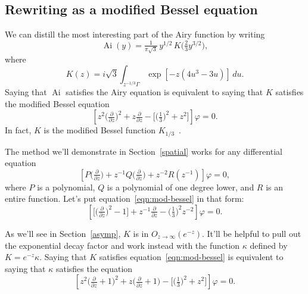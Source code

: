 \documentclass{article}
\theoremstyle{plain}
\DeclareMathOperator{\Ai}{Ai}
\begin{document}
\subsection{Rewriting as a modified Bessel equation}
We can distill the most interesting part of the Airy function by writing
\[ \Ai(y) = \tfrac{1}{\pi\sqrt{3}}\,y^{1/2}\,K\big(\tfrac{2}{3} y^{3/2}\big), \]
where
\begin{equation}\label{integral:mod-bessel}
K(z) = i\sqrt{3} \int_{z^{-1/3}\Gamma} \exp\left[-z \left(4u^3 - 3u\right)\right]\,du.
\end{equation}
Saying that $\Ai$ satisfies the Airy equation is equivalent to saying that $K$ satisfies the modified Bessel equation
\begin{equation}\label{eqn:mod-bessel}
\left[z^2 \big(\tfrac{\partial}{\partial z}\big)^2 + z \tfrac{\partial}{\partial z} - \big[\big(\tfrac{1}{3}\big)^2 + z^2\big]\right] \varphi = 0.
\end{equation}
In fact, $K$ is the modified Bessel function $K_{1/3}$~\cite[equation~9.6.1]{dlmf}.

The method we'll demonstrate in Section~\ref{spatial} works for any differential equation
\[ \left[ P\big(\tfrac{\partial}{\partial z}\big) + z^{-1} Q\big(\tfrac{\partial}{\partial z}\big) + z^{-2} R(z^{-1}) \right] \varphi = 0, \]
where $P$ is a polynomial, $Q$ is a polynomial of one degree lower, and $R$ is an entire function. Let's put equation~\ref{eqn:mod-bessel} in that form:
\begin{equation}\label{eqn:reg-mod-bessel}
\left[ \big[ \big(\tfrac{\partial}{\partial z}\big)^2 - 1 \big] + z^{-1} \tfrac{\partial}{\partial z} - \big(\tfrac{1}{3}\big)^2 z^{-2} \right] \varphi = 0.
\end{equation}

\color{violet}
As we'll see in Section~\ref{asymp}, $K$ is in $O_{z \to \infty}(e^{-z})$. It'll be helpful to pull out the exponential decay factor and work instead with the function $\kappa$ defined by $K = e^{-z} \kappa$. Saying that $K$ satisfies equation~\ref{eqn:mod-bessel} is equivalent to saying that $\kappa$ satisfies the equation
\begin{equation}\label{eqn:shifted-mod-bessel}
\left[z^2 \big(\tfrac{\partial}{\partial z} + 1\big)^2 + z \big(\tfrac{\partial}{\partial z} + 1\big) - \big[\big(\tfrac{1}{3}\big)^2 + z^2\big]\right] \varphi = 0.
\end{equation}
\color{black}
\end{document}
